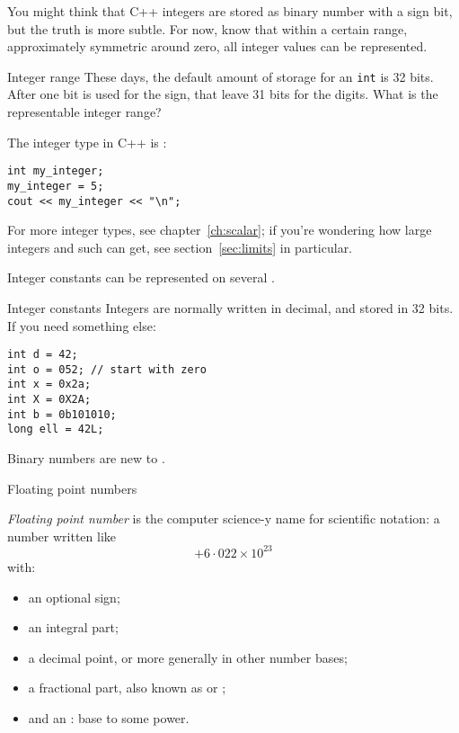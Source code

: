 You might think that C++ integers are stored as binary number with a sign  bit,
but the truth is more subtle.
For now, know that 
within a certain range, approximately symmetric around zero,
all integer values can be represented.

\begin{exercise}{Integer range}
  \label{ex:int-range}
  These days, the default amount of storage for an \lstinline{int} is
  32 bits. After one bit is used for the sign, that leave 31 bits for
  the digits. What is the representable integer range?
\end{exercise}

The integer type in C++ is :
\begin{lstlisting}
int my_integer;
my_integer = 5;
cout << my_integer << "\n";
\end{lstlisting}

For more integer types, see chapter~\ref{ch:scalar};
if you're wondering how large integers and such can get,
see section~\ref{sec:limits} in particular.

Integer constants can be represented on several .

\begin{block}{Integer constants}
  \label{sl:intvals}
  Integers are normally  written in decimal, and stored in 32 bits.
  If you need something else:
\begin{lstlisting}
int d = 42;
int o = 052; // start with zero
int x = 0x2a;
int X = 0X2A;
int b = 0b101010;
long ell = 42L;
\end{lstlisting}
\end{block}

Binary numbers are new to .

 {Floating point numbers}

\emph{Floating point number}
is the computer science-y name for scientific notation:
a number written like
\[ +6\cdot 022 \times 10^{23} \]
with:
\begin{itemize}
\item an optional sign;
\item an integral part;
\item a decimal point, or more generally 
  in other number bases;
\item a fractional part, also known as 
  or ;
\item and an : base to some power.
\end{itemize}

